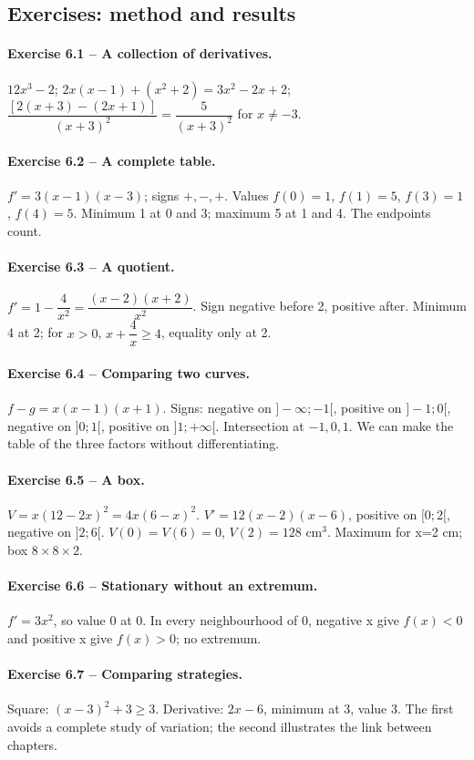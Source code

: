 \subsection*{Exercises: method and results}
\paragraph{Exercise 6.1 -- A collection of derivatives.} $12x^3-2$; $2x(x-1)+(x^2+2)=3x^2-2x+2$; $\dfrac{[2(x+3)-(2x+1)]}{(x+3)^2}=\dfrac{5}{(x+3)^2}$ for $x\ne-3$.
\paragraph{Exercise 6.2 -- A complete table.} $f\prime=3(x-1)(x-3)$; signs $+,-,+$. Values $f(0)=1$, $f(1)=5$, $f(3)=1$, $f(4)=5$. Minimum 1 at 0 and 3; maximum 5 at 1 and 4. The endpoints count.
\paragraph{Exercise 6.3 -- A quotient.} $f\prime =1-\dfrac{4}{x^2}=\dfrac{(x-2)(x+2)}{x^2}$. Sign negative before 2, positive after. Minimum 4 at 2; for $x>0$, $x+\dfrac{4}{x}\geq 4$, equality only at 2.
\paragraph{Exercise 6.4 -- Comparing two curves.} $f-g=x(x-1)(x+1)$. Signs: negative on $]-\infty;-1[$, positive on $]-1;0[$, negative on $]0;1[$, positive on $]1;+\infty[$. Intersection at $-1,0,1$. We can make the table of the three factors without differentiating.
\paragraph{Exercise 6.5 -- A box.} $V=x(12-2x)^2=4x(6-x)^2$. $V\prime=12(x-2)(x-6)$, positive on $[0;2[$, negative on $]2;6[$. $V(0)=V(6)=0$, $V(2)=128$ cm$^3$. Maximum for x=2 cm; box $8\times8\times2$.
\paragraph{Exercise 6.6 -- Stationary without an extremum.} $f\prime=3x^2$, so value 0 at 0. In every neighbourhood of 0, negative x give $f(x)<0$ and positive x give $f(x)>0$; no extremum.
\paragraph{Exercise 6.7 -- Comparing strategies.} Square: $(x-3)^2+3\geq3$. Derivative: $2x-6$, minimum at 3, value 3. The first avoids a complete study of variation; the second illustrates the link between chapters.
